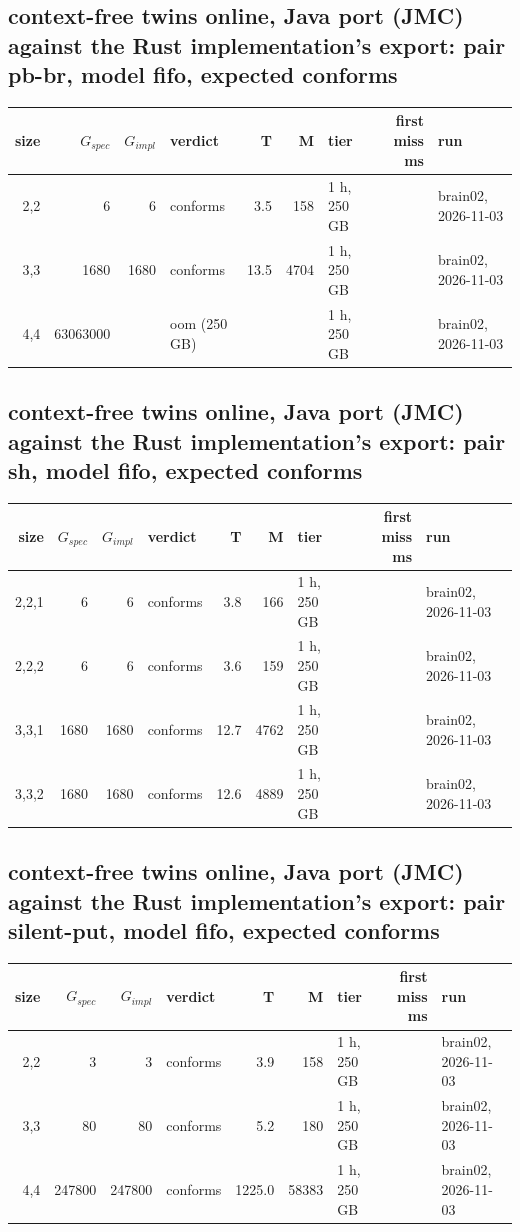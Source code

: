 \documentclass[10pt]{article}
\begin{document}
\subsection*{context-free twins online, Java port (JMC) against the Rust implementation's export: pair \textsf{pb-br}, model fifo, expected conforms}
\begin{longtable}{@{}rrrlrrlrl@{}}
\toprule
size & $G_{\mathit{spec}}$ & $G_{\mathit{impl}}$ & verdict & T & M & tier & first miss ms & run \\
\midrule
\endhead
\color{red} 2,2 & 6 & 6 & conforms & 3.5 & 158 & 1 h, 250 GB &  & brain02, 2026-11-03 \\
\color{red} 3,3 & 1680 & 1680 & conforms & 13.5 & 4704 & 1 h, 250 GB &  & brain02, 2026-11-03 \\
\color{red} 4,4 & 63063000 &  & oom (250 GB) &  &  & 1 h, 250 GB &  & brain02, 2026-11-03 \\
\bottomrule
\end{longtable}
\subsection*{context-free twins online, Java port (JMC) against the Rust implementation's export: pair \textsf{sh}, model fifo, expected conforms}
\begin{longtable}{@{}rrrlrrlrl@{}}
\toprule
size & $G_{\mathit{spec}}$ & $G_{\mathit{impl}}$ & verdict & T & M & tier & first miss ms & run \\
\midrule
\endhead
\color{red} 2,2,1 & 6 & 6 & conforms & 3.8 & 166 & 1 h, 250 GB &  & brain02, 2026-11-03 \\
\color{red} 2,2,2 & 6 & 6 & conforms & 3.6 & 159 & 1 h, 250 GB &  & brain02, 2026-11-03 \\
\color{red} 3,3,1 & 1680 & 1680 & conforms & 12.7 & 4762 & 1 h, 250 GB &  & brain02, 2026-11-03 \\
\color{red} 3,3,2 & 1680 & 1680 & conforms & 12.6 & 4889 & 1 h, 250 GB &  & brain02, 2026-11-03 \\
\bottomrule
\end{longtable}
\subsection*{context-free twins online, Java port (JMC) against the Rust implementation's export: pair \textsf{silent-put}, model fifo, expected conforms}
\begin{longtable}{@{}rrrlrrlrl@{}}
\toprule
size & $G_{\mathit{spec}}$ & $G_{\mathit{impl}}$ & verdict & T & M & tier & first miss ms & run \\
\midrule
\endhead
\color{red} 2,2 & 3 & 3 & conforms & 3.9 & 158 & 1 h, 250 GB &  & brain02, 2026-11-03 \\
\color{red} 3,3 & 80 & 80 & conforms & 5.2 & 180 & 1 h, 250 GB &  & brain02, 2026-11-03 \\
\color{red} 4,4 & 247800 & 247800 & conforms & 1225.0 & 58383 & 1 h, 250 GB &  & brain02, 2026-11-03 \\
\bottomrule
\end{longtable}
\end{document}
